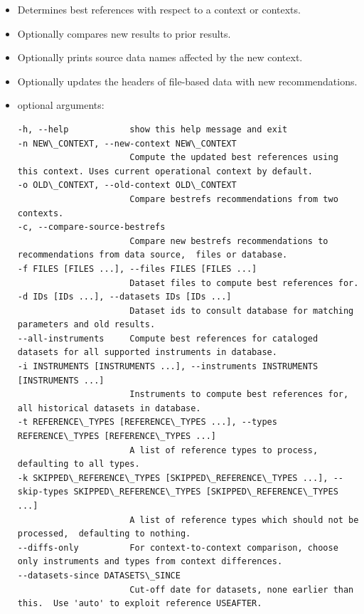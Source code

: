 \documentclass[letterpaper,10pt,english]{sphinxmanual}
\begin{document}
\begin{itemize}
\item {} 
Determines best references with respect to a context or contexts.

\item {} 
Optionally compares new results to prior results.

\item {} 
Optionally prints source data names affected by the new context.

\item {} 
Optionally updates the headers of file-based data with new recommendations.

\item {} 
optional arguments:

\begin{Verbatim}[commandchars=\\\{\}]
-h, --help            show this help message and exit
-n NEW\_CONTEXT, --new-context NEW\_CONTEXT
                      Compute the updated best references using this context. Uses current operational context by default.
-o OLD\_CONTEXT, --old-context OLD\_CONTEXT
                      Compare bestrefs recommendations from two contexts.
-c, --compare-source-bestrefs
                      Compare new bestrefs recommendations to recommendations from data source,  files or database.
-f FILES [FILES ...], --files FILES [FILES ...]
                      Dataset files to compute best references for.
-d IDs [IDs ...], --datasets IDs [IDs ...]
                      Dataset ids to consult database for matching parameters and old results.
--all-instruments     Compute best references for cataloged datasets for all supported instruments in database.
-i INSTRUMENTS [INSTRUMENTS ...], --instruments INSTRUMENTS [INSTRUMENTS ...]
                      Instruments to compute best references for, all historical datasets in database.
-t REFERENCE\_TYPES [REFERENCE\_TYPES ...], --types REFERENCE\_TYPES [REFERENCE\_TYPES ...]
                      A list of reference types to process,  defaulting to all types.
-k SKIPPED\_REFERENCE\_TYPES [SKIPPED\_REFERENCE\_TYPES ...], --skip-types SKIPPED\_REFERENCE\_TYPES [SKIPPED\_REFERENCE\_TYPES ...]
                      A list of reference types which should not be processed,  defaulting to nothing.
--diffs-only          For context-to-context comparison, choose only instruments and types from context differences.
--datasets-since DATASETS\_SINCE
                      Cut-off date for datasets, none earlier than this.  Use 'auto' to exploit reference USEAFTER.

\end{Verbatim}
\end{itemize}
\end{document}
